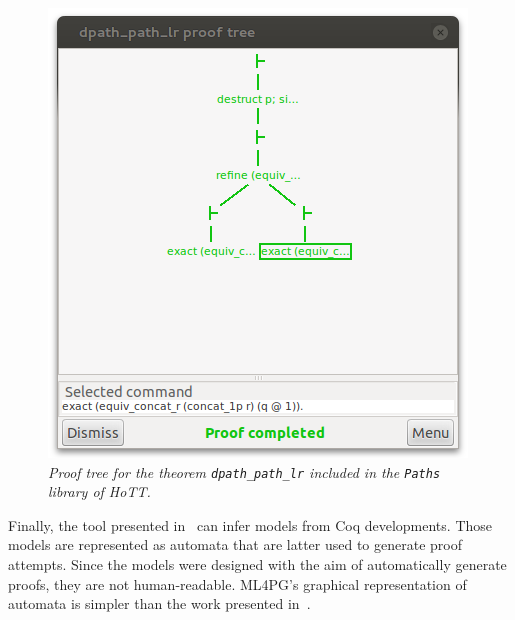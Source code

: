 \begin{figure}
\centering
\includegraphics[scale=.5]{prooftree.png}
\caption{\scriptsize{\emph{Proof tree for the theorem \texttt{dpath\_path\_lr} included in the \texttt{Paths} library of HoTT.}}}\label{fig:prooftree}
\end{figure}

Finally, the tool presented in~\cite{GNR14} can infer models from Coq developments. Those models are represented as automata that are latter used to generate proof attempts. Since the models were designed with the aim of automatically generate proofs, they are not human-readable.
ML4PG's graphical representation of automata is simpler than the work presented in~\cite{GNR14}.
